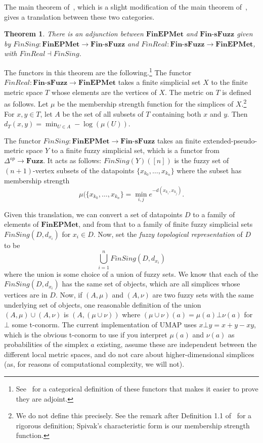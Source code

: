 \documentclass[a4paper,12pt,leqno]{article} \usepackage{amsmath}
\newtheorem*{thm}{Theorem}
\theoremstyle{definition}
\begin{document}
The main theorem of~\cite{McInnes18}, which is a slight modification of the main
theorem of~\cite{Spivak}, gives a translation between these two categories.
\begin{thm} There is an adjunction between $\textbf{FinEPMet}$ and
  $\textbf{Fin-sFuzz}$ given by $FinSing: \textbf{FinEPMet}\to
  \textbf{Fin-sFuzz}$ and $FinReal: \textbf{Fin-sFuzz}\to \textbf{FinEPMet}$,
  with $FinReal\dashv FinSing$.
\end{thm} The functors in this theorem are the
  following.\footnote{ See~\cite{McInnes18} for a categorical definition of
  these functors that makes it easier to prove they are adjoint.} The functor
  $FinReal: \textbf{Fin-sFuzz}\to\textbf{FinEPMet}$ takes a finite simplicial
  set $X$ to the finite metric space $T$ whose elements are the vertices of $X$.
  The metric on $T$ is defined as follows.
Let $\mu$ be the membership strength
  function for the simplices of $X$.\footnote{ We do not define this precisely.
  See the remark after Definition 1.1 of~\cite{Spivak} for a rigorous
  definition; Spivak's characteristic form is our membership strength function.}
  For $x, y\in T$, let $A$ be the set of all subsets of $T$ containing both $x$
  and $y$.
Then $d_T(x, y) = \min_{U\in A} -\log(\mu(U))$.

The functor $FinSing: \textbf{FinEPMet}\to \textbf{Fin-sFuzz}$ takes an finite
extended-pseudo-metric space $Y$ to a finite fuzzy simplicial set, which is
a functor from $\Delta^{op}\to \textbf{Fuzz}$.
It acts as follows:
$FinSing(Y)([n])$ is the fuzzy set of $(n+1)$-vertex subsets of the datapoints
$\{x_{k_0},\ldots,x_{k_n}\}$ where the subset has membership strength
$$\mu(\{x_{k_0},\ldots,x_{k_n}\} = \min_{i, j} e^{-d(x_{k_i}, x_{k_j})}.$$

Given this translation, we can convert a set of datapoints $D$ to a family of
elements of $\textbf{FinEPMet}$, and from that to a family of finite fuzzy
simplicial sets $FinSing(D, d_{x_i})$ for $x_i\in D$.
Now, set the \emph{fuzzy
topological representation} of $D$ to be $$\bigcup_{i=1}^n FinSing(D, d_{x_i})$$
where the union is some choice of a union of fuzzy sets.
We know that each of
the $FinSing(D, d_{x_i})$ has the same set of objects, which are all simplices
whose vertices are in $D$.
Now, if $(A, \mu)$ and $(A, \nu)$ are two fuzzy sets
with the same underlying set of objects, one reasonable definition of the union
$(A, \mu) \cup (A, \nu)$ is $(A, (\mu\cup\nu))$ where $(\mu\cup\nu)(a) = \mu(a)
\bot \nu(a)$ for $\bot$ some t-conorm.
The current implementation of UMAP uses
$x\bot y = x+y-xy$, which is the obvious t-conorm to use if you interpret
$\mu(a)$ and $\nu(a)$ as probabilities of the simplex $a$ existing, assume these
are independent between the different local metric spaces, and do not care about
higher-dimensional simplices (as, for reasons of computational complexity, we
will not).
\end{document}
